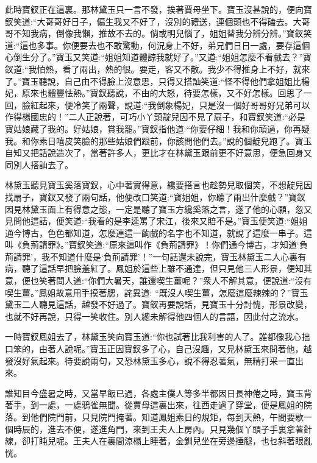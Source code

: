 \begin{parag}
    此時寶釵正在這裏。那林黛玉只一言不發，挨著賈母坐下。寶玉沒甚說的，便向寶釵笑道:“大哥哥好日子，偏生我又不好了，沒別的禮送，連個頭也不得磕去。大哥哥不知我病，倒像我懶，推故不去的。倘或明兒惱了，姐姐替我分辨分辨。”寶釵笑道:“這也多事。你便要去也不敢驚動，何況身上不好，弟兄們日日一處，要存這個心倒生分了。”寶玉又笑道:“姐姐知道體諒我就好了。”又道:“姐姐怎麼不看戲去？”寶釵道:“我怕熱，看了兩出，熱的很。要走，客又不散。我少不得推身上不好，就來了。”寶玉聽說，自己由不得臉上沒意思，只得又搭訕笑道:“怪不得他們拿姐姐比楊妃，原來也體豐怯熱。”寶釵聽說，不由的大怒，待要怎樣，又不好怎樣。回思了一回，臉紅起來，便冷笑了兩聲，說道:“我倒象楊妃，只是沒一個好哥哥好兄弟可以作得楊國忠的！”二人正說著，可巧小丫頭靛兒因不見了扇子，和寶釵笑道:“必是寶姑娘藏了我的。好姑娘，賞我罷。”寶釵指他道:“你要仔細！我和你頑過，你再疑我。和你素日嘻皮笑臉的那些姑娘們跟前，你該問他們去。”說的個靛兒跑了。寶玉自知又把話說造次了，當著許多人，更比才在林黛玉跟前更不好意思，便急回身又同別人搭訕去了。
\end{parag}


\begin{parag}
    林黛玉聽見寶玉奚落寶釵，心中著實得意，纔要搭言也趁勢兒取個笑，不想靛兒因找扇子，寶釵又發了兩句話，他便改口笑道:“寶姐姐，你聽了兩出什麼戲？”寶釵因見林黛玉面上有得意之態，一定是聽了寶玉方纔奚落之言，遂了他的心願，忽又見問他這話，便笑道:“我看的是李逵罵了宋江，後來又賠不是。”寶玉便笑道:“姐姐通今博古，色色都知道，怎麼連這一齣戲的名字也不知道，就說了這麼一串子。這叫《負荊請罪》。”寶釵笑道:“原來這叫作《負荊請罪》！你們通今博古，才知道‘負荊請罪’，我不知道什麼是‘負荊請罪’！”一句話還未說完，寶玉林黛玉二人心裏有病，聽了這話早把臉羞紅了。鳳姐於這些上雖不通達，但只見他三人形景，便知其意，便也笑著問人道:“你們大暑天，誰還喫生薑呢？”衆人不解其意，便說道:“沒有喫生薑。”鳳姐故意用手摸著腮，詫異道: “既沒人喫生薑，怎麼這麼辣辣的？”寶玉黛玉二人聽見這話，越發不好過了。寶釵再要說話，見寶玉十分討愧，形景改變，也就不好再說，只得一笑收住。別人總未解得他四個人的言語，因此付之流水。
\end{parag}


\begin{parag}
    一時寶釵鳳姐去了，林黛玉笑向寶玉道:“你也試著比我利害的人了。誰都像我心拙口笨的，由著人說呢。”寶玉正因寶釵多了心，自己沒趣，又見林黛玉來問著他，越發沒好氣起來。待要說兩句，又恐林黛玉多心，說不得忍著氣，無精打采一直出來。
\end{parag}


\begin{parag}
    誰知目今盛暑之時，又當早飯已過，各處主僕人等多半都因日長神倦之時，寶玉背著手，到一處，一處鴉雀無聞。從賈母這裏出來，往西走過了穿堂，便是鳳姐的院落。到他們院門前，只見院門掩著。知道鳳姐素日的規矩，每到天熱，午間要歇一個時辰的，進去不便，遂進角門，來到王夫人上房內。只見幾個丫頭子手裏拿著針線，卻打盹兒呢。王夫人在裏間涼榻上睡著，金釧兒坐在旁邊捶腿，也乜斜著眼亂恍。
\end{parag}


